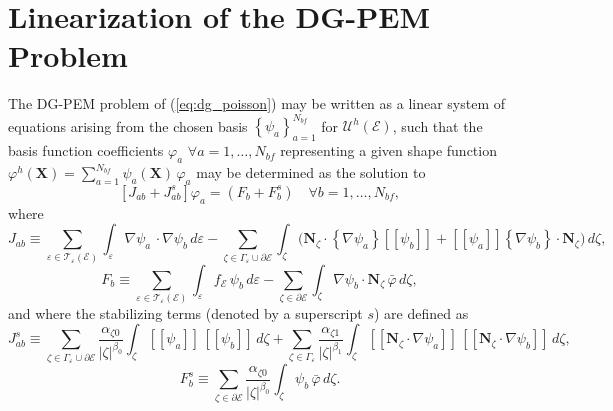 \section{Linearization of the DG-PEM Problem}

	The DG-PEM problem of (\ref{eq:dg_poisson}) may be written as a linear system of equations arising from the chosen basis $\left\{ \psi_a \right\}_{a=1}^{N_{bf}}$ for $\mathcal{U}^h (\mathcal{E})$, such that the basis function coefficients $\varphi_a \, \, \forall a = 1, \ldots, N_{bf}$ representing a given shape function $\varphi^h (\mathbf{X}) = \sum_{a=1}^{N_{bf}} \psi_a (\mathbf{X}) \, \varphi_a$ may be determined as the solution to
	\begin{equation}
		\left[ J_{ab} + J_{ab}^{s} \right] \varphi_a = (F_{b} + F_{b}^{s}) \quad \forall b = 1, \ldots, N_{bf},
	\end{equation}
	where
	\begin{equation}
			J_{ab} \equiv \sum_{\varepsilon \in \mathcal{T}_\varepsilon (\mathcal{E})} \int_{\varepsilon} \nabla \psi_a \, \cdot \nabla \psi_b \, d \varepsilon - \sum_{\zeta \in \Gamma_\varepsilon \cup \partial \mathcal{E}} \int_{\zeta} \bigg( \mathbf{N}_{\zeta} \cdot \left\{ \nabla \psi_a \right\} [\![ \psi_b ]\!] + [\![ \psi_a ]\!] \left\{ \nabla \psi_b \right\} \cdot \mathbf{N}_{\zeta} \bigg) \, d \zeta, 
	\end{equation}
	\begin{equation}
		F_b \equiv \sum_{\varepsilon \in \mathcal{T}_\varepsilon (\mathcal{E})} \int_{\varepsilon} f_{\mathcal{E}} \, \psi_b \, d \varepsilon - \sum_{\zeta \in \partial \mathcal{E}} \int_{\zeta} \nabla \psi_b \cdot \mathbf{N}_{\zeta} \, \bar{\varphi} \, d \zeta,
	\end{equation}
	and where the stabilizing terms (denoted by a superscript $s$) are defined as
	\begin{equation}
		J_{ab}^{s} \equiv \sum_{\zeta \in \Gamma_\varepsilon \cup \partial \mathcal{E}} \frac{\alpha_{\zeta0}}{|\zeta|^{\beta_0}} \int_{\zeta} [\![ \psi_a ]\!] \, [\![ \psi_b ]\!] \, d \zeta + \sum_{\zeta \in \Gamma_\varepsilon} \frac{\alpha_{\zeta1}}{|\zeta|^{\beta_1}} \int_{\zeta} \left[\!\!\left[ \mathbf{N}_\zeta \cdot \nabla \psi_a \right]\!\!\right] \, \left[\!\!\left[ \mathbf{N}_\zeta \cdot \nabla \psi_b \right]\!\!\right] \, d \zeta,
	\end{equation}
	\begin{equation}
			F_b^s \equiv \sum_{\zeta \in \partial \mathcal{E}} \frac{\alpha_{\zeta0}}{|\zeta|^{\beta_0}} \int_{\zeta} \psi_b \, \bar{\varphi} \, d \zeta.
	\end{equation}
	
